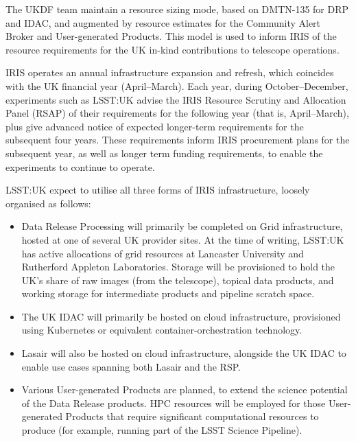 The UKDF team maintain a resource sizing mode, based on DMTN-135 for DRP and IDAC, and augmented by resource estimates for the Community Alert Broker and User-generated Products. This model is used to inform IRIS of the resource requirements for the UK in-kind contributions to telescope operations.

IRIS operates an annual infrastructure expansion and refresh, which coincides with the UK financial year (April--March). Each year, during October--December, experiments such as LSST:UK advise the IRIS Resource Scrutiny and Allocation Panel (RSAP) of their requirements for the following year (that is, April--March), plus give advanced notice of expected longer-term requirements for the subsequent four years. These requirements inform IRIS procurement plans for the subsequent year, as well as longer term funding requirements, to enable the experiments to continue to operate.

LSST:UK expect to utilise all three forms of IRIS infrastructure, loosely organised as follows:

\begin{itemize}

\item Data Release Processing will primarily be completed on Grid infrastructure, hosted at one of several UK provider sites. At the time of writing, LSST:UK has active allocations of grid resources at Lancaster University and Rutherford Appleton Laboratories. Storage will be provisioned to hold the UK's share of raw images (from the telescope), topical data products, and working storage for intermediate products and pipeline scratch space.

\item The UK IDAC will primarily be hosted on cloud infrastructure, provisioned using Kubernetes or equivalent container-orchestration technology.

\item Lasair will also be hosted on cloud infrastructure, alongside the UK IDAC to enable use cases spanning both Lasair and the RSP.

\item Various User-generated Products are planned, to extend the science potential of the Data Release products. HPC resources will be employed for those User-generated Products that require significant computational resources to produce (for example, running part of the LSST Science Pipeline).

\end{itemize}

